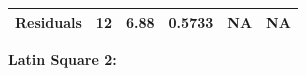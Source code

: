 \documentclass[]{article}
\begin{document}
\begin{longtable}[]{@{}cccccc@{}}
\begin{minipage}[t]{0.19\columnwidth}
\textbf{Residuals}\strut
\end{minipage} & \begin{minipage}[t]{0.06\columnwidth}\centering\strut
12\strut
\end{minipage} & \begin{minipage}[t]{0.10\columnwidth}\centering\strut
6.88\strut
\end{minipage} & \begin{minipage}[t]{0.12\columnwidth}\centering\strut
0.5733\strut
\end{minipage} & \begin{minipage}[t]{0.12\columnwidth}\centering\strut
NA\strut
\end{minipage} & \begin{minipage}[t]{0.12\columnwidth}\centering\strut
NA\strut
\end{minipage}\tabularnewline
\bottomrule
\end{longtable}

\textbf{Latin Square 2:}
\end{document}
